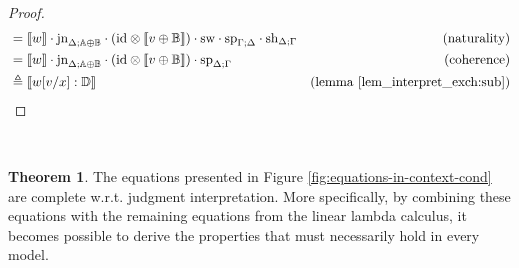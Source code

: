 \documentclass[10pt,a4paper]{amsart}
\theoremstyle{definition}
\theoremstyle{definition}
\theoremstyle{definition}
\theoremstyle{definition}
\theoremstyle{definition}
\theoremstyle{definition}
\newtheorem{theorem}[definition]{Theorem}
\begin{document}
\begin{proof}
\begin{align*}
  & = \llbracket w \rrbracket \cdot \text{jn}_{\Delta;\mathbb{A} \oplus \mathbb{B}} \cdot ( \text{id} \otimes \llbracket v \oplus \mathbb{B}\rrbracket )  \cdot  \mathrm{sw}  \cdot  \text{sp}_{\Gamma;\Delta} \cdot \text{sh}_{\Delta;\Gamma}  & {\text{(naturality)}}\\
  &  = \llbracket w \rrbracket \cdot \text{jn}_{\Delta;\mathbb{A} \oplus \mathbb{B}} \cdot ( \text{id} \otimes \llbracket v \oplus \mathbb{B}\rrbracket )  \cdot  \text{sp}_{\Delta; \Gamma} & {\text{(coherence)}}\\
  & \triangleq \llbracket w[v/x] : \mathbb{D} \rrbracket & {\text{(lemma \ref{lem_interpret_exch:sub})}}
\end{align*}
\end{proof}

~
\begin{theorem} \label {theorem:comp_eq_in_context}
  The equations presented in Figure \ref{fig:equations-in-context-cond} are complete w.r.t. judgment interpretation. More specifically, by combining these equations with the remaining equations from the linear lambda calculus, it becomes possible to derive the properties that must necessarily hold in every model.
\end{theorem}
\end{document}
